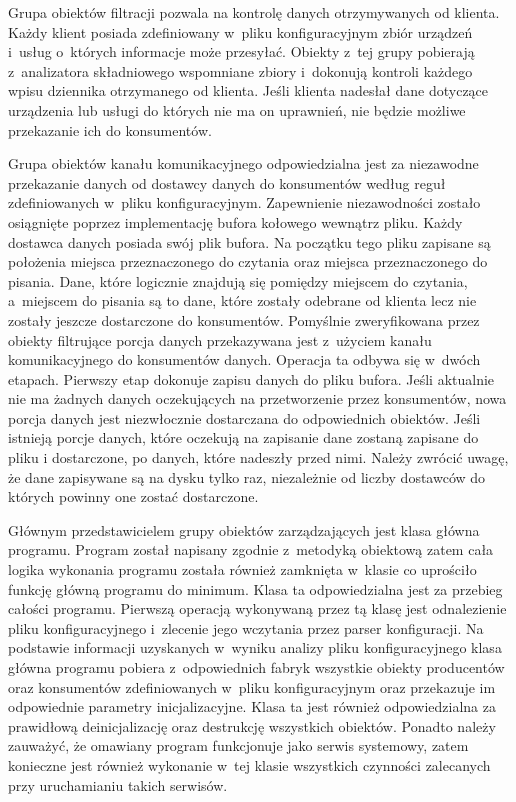 Grupa obiektów filtracji pozwala na kontrolę danych otrzymywanych od
klienta. Każdy klient posiada zdefiniowany w~pliku konfiguracyjnym
zbiór urządzeń i~usług o~których informacje może przesyłać. Obiekty
z~tej grupy pobierają z~analizatora składniowego wspomniane zbiory
i~dokonują kontroli każdego wpisu dziennika otrzymanego od
klienta. Jeśli klienta nadesłał dane dotyczące urządzenia lub usługi
do których nie ma on uprawnień, nie będzie możliwe przekazanie ich do
konsumentów.

Grupa obiektów kanału komunikacyjnego odpowiedzialna jest za
niezawodne przekazanie danych od dostawcy danych do konsumentów według
reguł zdefiniowanych w~pliku konfiguracyjnym. Zapewnienie
niezawodności zostało osiągnięte poprzez implementację bufora kołowego
wewnątrz pliku. Każdy dostawca danych posiada swój plik bufora. Na
początku tego pliku zapisane są położenia miejsca przeznaczonego do
czytania oraz miejsca przeznaczonego do pisania. Dane, które logicznie
znajdują się pomiędzy miejscem do czytania, a~miejscem do pisania są
to dane, które zostały odebrane od klienta lecz nie zostały jeszcze
dostarczone do konsumentów. Pomyślnie zweryfikowana przez obiekty
filtrujące porcja danych przekazywana jest z~użyciem kanału
komunikacyjnego do konsumentów danych. Operacja ta odbywa się w~dwóch
etapach. Pierwszy etap dokonuje zapisu danych do pliku bufora. Jeśli
aktualnie nie ma żadnych danych oczekujących na przetworzenie przez
konsumentów, nowa porcja danych jest niezwłocznie dostarczana do
odpowiednich obiektów. Jeśli istnieją porcje danych, które oczekują na
zapisanie dane zostaną zapisane do pliku i dostarczone, po danych,
które nadeszły przed nimi. Należy zwrócić uwagę, że dane zapisywane są
na dysku tylko raz, niezależnie od liczby dostawców do których powinny
one zostać dostarczone.

Głównym przedstawicielem grupy obiektów zarządzających jest klasa główna
programu. Program został napisany zgodnie z~metodyką obiektową zatem
cała logika wykonania programu została również zamknięta w~klasie co
uprościło funkcję główną programu do minimum. Klasa ta odpowiedzialna
jest za przebieg całości programu. Pierwszą operacją wykonywaną przez
tą klasę jest odnalezienie pliku konfiguracyjnego i~zlecenie jego
wczytania przez parser konfiguracji. Na podstawie informacji
uzyskanych w~wyniku analizy pliku konfiguracyjnego klasa główna
programu pobiera z~odpowiednich fabryk wszystkie obiekty producentów
oraz konsumentów zdefiniowanych w~pliku konfiguracyjnym oraz
przekazuje im odpowiednie parametry inicjalizacyjne. Klasa ta jest
również odpowiedzialna za prawidłową deinicjalizację oraz destrukcję
wszystkich obiektów. Ponadto należy zauważyć, że omawiany program
funkcjonuje jako serwis systemowy, zatem konieczne jest również
wykonanie w~tej klasie wszystkich czynności zalecanych przy
uruchamianiu takich serwisów.

